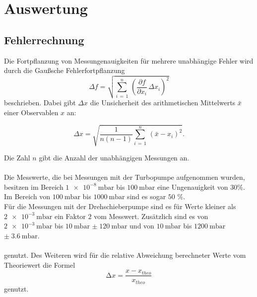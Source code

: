 \newpage 
\section{Auswertung}

        \subsection{Fehlerrechnung}
        \noindent
        Die Fortpflanzung von Messungenauigkeiten für mehrere unabhängige Fehler wird durch die Gaußsche Fehlerfortpflanzung
        \begin{equation*}
        \Delta f = \sqrt{\sum_{i \, = \, 1}^{n} \, \left(\frac{\partial f}{\partial x_i} \, \Delta x_i\right)^2}
        \label{fehler}
        \end{equation*}
        beschrieben. Dabei gibt $\Delta x$ die Unsicherheit des arithmetischen Mittelwerts $\bar{x}$ einer Observablen $x$ an:
        
        \begin{equation*}
        \Delta x =  \sqrt{\frac{1}{n(n-1)} \sum_{i \, = \, 1}^{n} \, \left(\bar{x}- x_i\right)^2}.
        \end{equation*}

        \noindent
        Die Zahl $n$ gibt die Anzahl der unabhängigen Messungen an.\\\\
        Die Messwerte, die bei Messungen mit der Turbopumpe aufgenommen wurden, besitzen im Bereich $\SI{1e-8}{\milli\bar}$ bis $\SI{100}{\milli\bar}$ eine Ungenauigkeit von $30$\%.
        Im Bereich von $\SI{100}{\milli\bar}$ bis $\SI{1000}{\milli\bar}$ sind es sogar $50$ \%.\\
        Für die Messungen mit der Drehschieberpumpe sind es für Werte kleiner als $\SI{2e-3}{\milli\bar}$ ein Faktor $2$ vom Messwert.
        Zusätzlich sind es von $\SI{2e-3}{\milli\bar}$ bis $\SI{10}{\milli\bar}$ $\pm\; \SI{120}{\milli\bar}$ 
        und von $\SI{10}{\milli\bar}$ bis $\SI{1200}{\milli\bar}$ $\pm \;\SI{3.6}{\milli\bar}$.\\\\

        genutzt. Des Weiteren wird für die relative Abweichung berechneter Werte vom Theoriewert die Formel 
        \begin{equation*}
          \increment x = \frac{x - x_{theo}}{x_{theo}}
        \end{equation*}
        genutzt.

